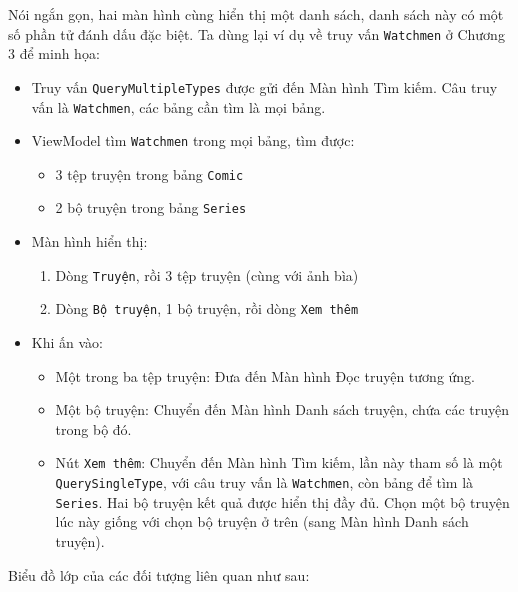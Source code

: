 \documentclass[
]{article}
\providecommand{\tightlist}{%
  \setlength{\itemsep}{0pt}\setlength{\parskip}{0pt}}
\begin{document}
Nói ngắn gọn, hai màn hình cùng hiển thị một danh sách, danh sách này có
một số phần tử đánh dấu đặc biệt. Ta dùng lại ví dụ về truy vấn
\texttt{Watchmen} ở Chương 3 để minh họa:

\begin{itemize}
\item
  Truy vấn \texttt{QueryMultipleTypes} được gửi đến Màn hình Tìm kiếm.
  Câu truy vấn là \texttt{Watchmen}, các bảng cần tìm là mọi bảng.
\item
  ViewModel tìm \texttt{Watchmen} trong mọi bảng, tìm được:

  \begin{itemize}
  \tightlist
  \item
    3 tệp truyện trong bảng \texttt{Comic}
  \item
    2 bộ truyện trong bảng \texttt{Series}
  \end{itemize}
\item
  Màn hình hiển thị:

  \begin{enumerate}
  \def\labelenumi{\arabic{enumi}.}
  \tightlist
  \item
    Dòng \texttt{Truyện}, rồi 3 tệp truyện (cùng với ảnh bìa)
  \item
    Dòng \texttt{Bộ\ truyện}, 1 bộ truyện, rồi dòng \texttt{Xem\ thêm}
  \end{enumerate}
\item
  Khi ấn vào:

  \begin{itemize}
  \tightlist
  \item
    Một trong ba tệp truyện: Đưa đến Màn hình Đọc truyện tương ứng.
  \item
    Một bộ truyện: Chuyển đến Màn hình Danh sách truyện, chứa các truyện
    trong bộ đó.
  \item
    Nút \texttt{Xem\ thêm}: Chuyển đến Màn hình Tìm kiếm, lần này tham
    số là một \texttt{QuerySingleType}, với câu truy vấn là
    \texttt{Watchmen}, còn bảng để tìm là \texttt{Series}. Hai bộ truyện
    kết quả được hiển thị đầy đủ. Chọn một bộ truyện lúc này giống với
    chọn bộ truyện ở trên (sang Màn hình Danh sách truyện).
  \end{itemize}
\end{itemize}

Biểu đồ lớp của các đối tượng liên quan như sau:
\end{document}
